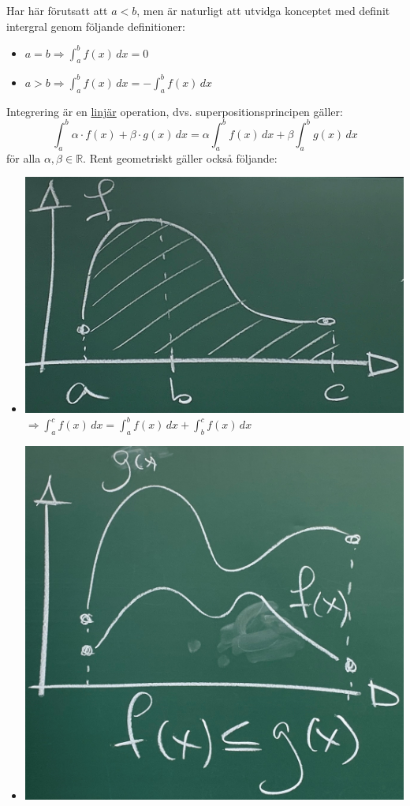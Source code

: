 Har här förutsatt att $a<b$, men är naturligt att utvidga konceptet med definit intergral genom följande definitioner:
\begin{itemize}
    \item $a=b\Rightarrow \int_a^b f(x)\, dx = 0$
    \item $a>b\Rightarrow \int_a^b f(x)\, dx = - \int_a^b f(x)\, dx$
\end{itemize}
Integrering är en \underline{linjär} operation, dvs. superpositionsprincipen gäller:
\begin{equation*}
    \int_{a}^{b} \alpha \cdot f(x) +\beta \cdot g(x) \, dx =
    \alpha \int_{a}^{b} f(x)\, dx + \beta \int_{a}^{b} g(x)\, dx
\end{equation*}
för alla $\alpha,\beta\in\mathbb{R}$.
Rent geometriskt gäller också följande:
\begin{itemize}
    \item \includegraphics[scale=0.1]{lessons/lesson15/imgs/img02.jpg}\\
          $\Rightarrow \int_a^c f(x)\, dx = \int_a^b f(x)\, dx + \int_b^c f(x)\, dx$
    \item \includegraphics[scale=0.1]{lessons/lesson15/imgs/img03.jpg}\\

\end{itemize}
